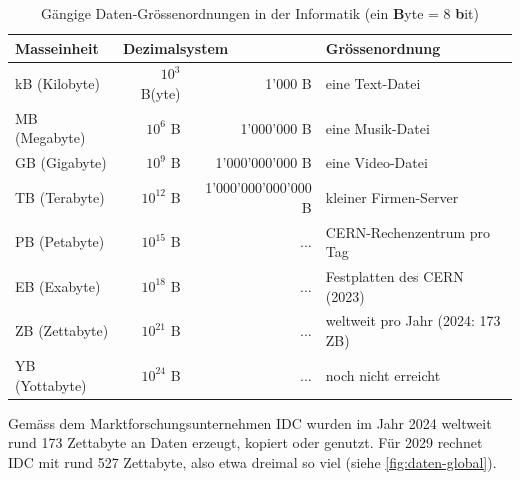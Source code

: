 \begin{table}[H]
  \centering
  \begin{tabular}{@{}lrrl@{}}
    \toprule
    \textbf{Masseinheit} & \multicolumn{2}{l}{\textbf{Dezimalsystem}} & Grössenordnung                                   \\ \midrule
    kB (Kilobyte)        & $10^3$ B(yte)                               & 1'000 B             & eine Text-Datei            \\
    MB (Megabyte)        & $10^6$ B                                    & 1'000'000 B         & eine Musik-Datei           \\
    GB (Gigabyte)        & $10^9$ B                                    & 1'000'000'000 B     & eine Video-Datei           \\
    TB (Terabyte)        & $10^{12}$ B                                 & 1'000'000'000'000 B & kleiner Firmen-Server      \\
    PB (Petabyte)        & $10^{15}$ B                                 & ...                 & CERN-Rechenzentrum pro Tag\footnotemark \\
    EB (Exabyte)         & $10^{18}$ B                                 & ...                 & Festplatten des CERN (2023)\footnotemark \\
    ZB (Zettabyte)       & $10^{21}$ B                                 & ...                 & weltweit pro Jahr (2024: 173 ZB) \\
    YB (Yottabyte)       & $10^{24}$ B                                 & ...                 & noch nicht erreicht        \\ \bottomrule
  \end{tabular}
  \caption{Gängige Daten-Grössenordnungen in der Informatik (ein \textbf{B}yte = 8 \textbf{b}it)}
  \label{table:groessenordnungen}
\end{table}
\addtocounter{footnote}{-1}

Gemäss dem Marktforschungsunternehmen IDC wurden im Jahr 2024 weltweit rund 173 Zettabyte an Daten erzeugt, kopiert oder genutzt. Für 2029 rechnet IDC mit rund 527 Zettabyte, also etwa dreimal so viel (siehe \cref{fig:daten-global}).


